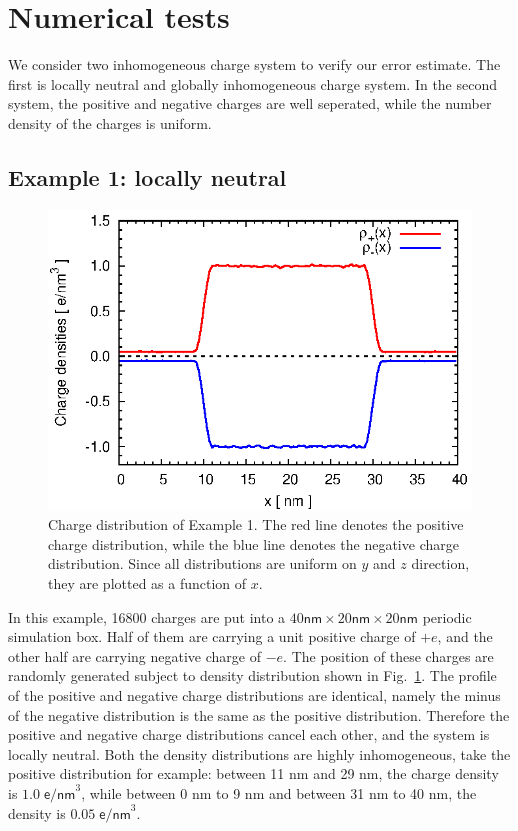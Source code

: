\documentclass[aps,pre,preprint]{revtex4}
\begin{document}
\section{Numerical tests}\label{sec:tmp3}

We consider two inhomogeneous charge system to verify our error
estimate.  The first is locally neutral and globally inhomogeneous
charge system. In the second system, the positive and negative charges
are well seperated, while the number density of the charges is
uniform.

\subsection{Example 1: locally neutral}

\begin{figure}
  \centering
  \includegraphics[width=.48\textwidth]{fig/error.one_peak.box40x20x20.b1.000.r3.00.n6.K101x051x051/fig.rho.eps}
  \caption{Charge distribution of Example 1. The red line
    denotes the positive charge distribution, while the blue line
    denotes the negative charge distribution. Since all distributions
    are uniform on $y$ and $z$ direction, they are plotted as a
    function of $x$.}
  \label{fig:tmp-rho0}
\end{figure}

In this example, 16800 charges are put into a $40\textsf{nm}\times
20\textsf{nm}\times 20\textsf{nm}$ periodic simulation box. Half of
them are carrying a unit positive charge of $+e$, and the other half
are carrying negative charge of $-e$. The position of these charges
are randomly generated subject to density distribution shown in
Fig.~\ref{fig:tmp-rho0}.  The profile of the positive and negative
charge distributions are identical, namely the minus of the negative
distribution is the same as the positive distribution. Therefore the
positive and negative charge distributions cancel each other, and the
system is locally neutral. Both the density distributions are highly
inhomogeneous, take the positive distribution for example: between 11
\textsf{nm} and 29 \textsf{nm}, the charge density is
$1.0\;\textsf{e/nm}^3$, while between 0 \textsf{nm} to 9 \textsf{nm}
and between 31 \textsf{nm} to 40 \textsf{nm}, the density is
$0.05\;\textsf{e/nm}^3$.
\end{document}
